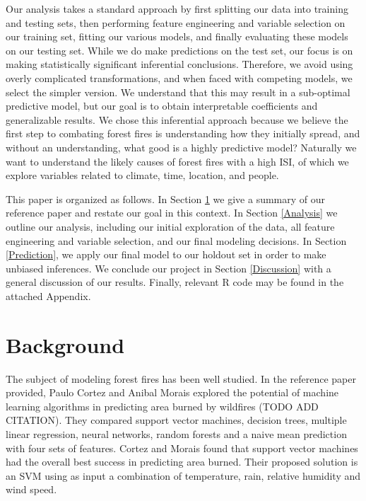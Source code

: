 \documentclass{article}
\begin{document}
Our analysis takes a standard approach by first splitting our data into training and testing sets, then performing feature engineering and variable selection on our training set, fitting our various models, and finally evaluating these models on our testing set. While we do make predictions on the test set, our focus is on making statistically significant inferential conclusions. Therefore, we avoid using overly complicated transformations, and when faced with competing models, we select the simpler version. We understand that this may result in a sub-optimal predictive model, but our goal is to obtain interpretable coefficients and generalizable results. We chose this inferential approach because we believe the first step to combating forest fires is understanding how they initially spread, and without an understanding, what good is a highly predictive model? Naturally we want to understand the likely causes of forest fires with a high ISI, of which we explore variables related to climate, time, location, and people.

This paper is organized as follows. In Section \ref{Background} we give a summary of our reference paper and restate our goal in this context. In Section \ref{Analysis} we outline our analysis, including our initial exploration of the data, all feature engineering and variable selection, and our final modeling decisions. In Section \ref{Prediction}, we apply our final model to our holdout set in order to make unbiased inferences. We conclude our project in Section \ref{Discussion} with a general discussion of our results. Finally, relevant R code may be found in the attached Appendix.

\section{Background}\label{Background}

The subject of modeling forest fires has been well studied. In the reference paper provided, Paulo Cortez and Anibal Morais explored the potential of machine learning algorithms in predicting area burned by wildfires (TODO ADD CITATION). They compared support vector machines, decision trees, multiple linear regression, neural networks, random forests and a naive mean prediction with four sets of features. Cortez and Morais found that support vector machines had the overall best success in predicting area burned. Their proposed solution is an SVM using as input a combination of temperature, rain, relative humidity and wind speed.
\end{document}
